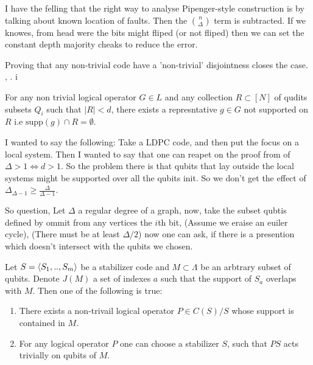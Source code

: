 \documentclass[manuscript,screen,review]{acmart}
\begin{document}
{ I have the felling that the right way to analyse Pipenger-style construction is by talking about known location of faults. Then the ${ n \choose \Delta }$ term is subtracted. If we knowes, from head were the bits might fliped (or not fliped) then we can set the constant depth majority cheaks to reduce the error.   


 Proving that any non-trivial code have a 'non-trivial' disjointness closes the case. \cite{Jochym_O_Connor_2018}, \cite{bostanci2021findingdisjointnessstabilizercodes}. 
i

\begin{lemma} For any non trivial logical operator $G \in L$ and any collection $R \subset [N]$ of qudits subsets $Q_i$ such that $|R| < d$, there exists a represntative $g \in G$ not supported on $R$ i.e $\text{supp}(g) \cap R = \emptyset$. 
\end{lemma}

I wanted to say the following: Take a LDPC code, and then put the focus on a local system. Then I wanted to say that one can reapet on the proof from \cite{Jochym_O_Connor_2018} of $ \Delta > 1 \Leftrightarrow d > 1$. So the problem there is that qubits that lay outside the local systems might be supported over all the qubits init. So we don't get the effect of $\Delta_{\Delta-1} \ge \frac{\Delta}{\Delta - 1} $. 

So question, Let $\Delta$ a regular degree of a graph, now, take the subset qubtis defined by ommit from any vertices the $i$th bit, (Assume we eraise an euiler cycle), (There must be at least $\Delta /2$) now one can ask, if there is a presention which doesn't intersect with the qubits we chosen.

\begin{lemma} Let $S = \braket{S_1,..,S_{m}}$ be a stabilizer code and $M\subset \Lambda$ be an arbtrary subset of qubits. Denote $J(M)$ a set of indexes $a$ such that the support of $S_{a}$ overlaps with $M$. Then one of the following is true: 
  \begin{enumerate}
    \item There exists a non-trivail logical operator $P \in C(S)/S$ whose support is contained in $M$. 
    \item For any logical operator $P$ one can choose a stabilizer $S$, such that $PS$ acts trivially on qubits of $M$. 
  \end{enumerate}


\end{lemma}

}
\end{document}
